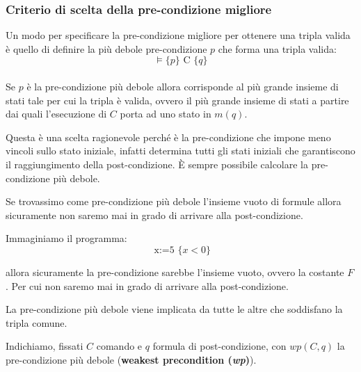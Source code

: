 				      				\subsubsection{Criterio di scelta della pre-condizione migliore}
				      			    \begin{definizione}
				      			        Un modo per specificare la pre-condizione migliore per ottenere una
				      				tripla valida è quello di definire la più
				      				debole pre-condizione $p$ che forma una tripla valida:
				      				\[\vDash \{p\}\mbox{ C }\{q\}\] \\
				      				Se $p$ è la pre-condizione più debole allora corrisponde al più grande insieme di
				      				stati tale per cui la tripla è valida, ovvero il più grande insieme di stati a partire dai quali l'esecuzione di $C$ porta ad uno stato in $m(q)$.
				      			    \end{definizione} \vspace{5mm} %
				      				Questa è una scelta ragionevole perché è la pre-condizione che impone meno
				      				vincoli sullo stato iniziale, infatti determina tutti gli stati iniziali che
				      				garantiscono il raggiungimento della post-condizione. È sempre possibile
				      				calcolare la pre-condizione più debole.\\
				      				\begin{nota}
				      				Se trovassimo come pre-condizione più debole l'insieme vuoto di formule allora sicuramente non saremo mai in grado di arrivare alla post-condizione.
				      				
				      				\begin{esempio}
				      				    Immaginiamo il programma:
				      				    \[\mbox{ x:=5 }\{x < 0\}\]
				      				    
				      				    allora sicuramente la pre-condizione sarebbe l'insieme vuoto, ovvero la costante $F$. Per cui non saremo mai in grado di arrivare alla post-condizione.
				      				\end{esempio}
				      				\end{nota}
				      				\begin{definizione}
				      				    La pre-condizione più debole viene implicata da tutte le altre che soddisfano la tripla comune.
				      				\end{definizione}
				      			\begin{definizione}
				      			    	Indichiamo, fissati $C$ comando e $q$ formula di post-condizione, con $wp(C, q)$
				      				la pre-condizione più debole (\textbf{weakest precondition (\textit{wp})}).
				      			\end{definizione}
